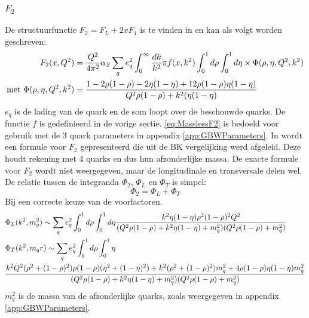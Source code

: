 \documentclass[a4paper,11pt]{article}
\numberwithin{equation}{section} %
\begin{document}
    \subsubsection{$F_2$} \label{sec:SF}
De structuurfunctie $F_2 = F_L + 2x F_1$ is te vinden in \cite[vgl. 9.200]{Barone} en kan als volgt worden geschreven:
\begin{align} \label{eq:MasslessF2}
F_2(x,Q^2) &= \frac{Q^2}{4\pi^2} \alpha_S \sum_q e_q^2 \int_0^\infty \frac{dk}{k^2}\pi f(x,k^2) \int_0^1 d\rho \int_0^1 d\eta \times \Phi(\rho, \eta, Q^2, k^2) \\
\text{met } \Phi(\rho, \eta, Q^2, k^2) &= \frac{1-2\rho(1-\rho)-2\eta(1-\eta)+12\rho(1-\rho)\eta(1-\eta)}{Q^2 \rho(1-\rho) + k^2 (\eta(1-\eta)}\notag
\end{align}
$e_q$ is de lading van de quark en de som loopt over de beschouwde quarks.
De functie $f$ is gedefinieerd in de vorige sectie.
\eqref{eq:MasslessF2} is bedoeld voor gebruik met de 3 quark parameters in appendix \ref{app:GBWParameters}.
In \cite{Bondarenko} wordt een formule voor $F_2$ gepresenteerd die uit de BK vergelijking werd afgeleid.
Deze houdt rekening met 4 quarks en dus hun afzonderlijke massa.
De exacte formule voor $F_2$ wordt niet weergegeven, maar de longitudinale en transversale delen wel.
De relatie tussen de integranda $\Phi_2$, $\Phi_L$ en $\Phi_T$ is simpel:
\begin{equation}
\Phi_2 = \Phi_L + \Phi_T
\end{equation}
Bij een correcte keuze van de voorfactoren.
\begin{align} \label{eq:MassiveSF}
&\Phi_L(k^2, m_q^2) \sim \sum_q e_q^2 \int_0^1 d\rho \int_0^1 d\eta \frac{k^2 \eta(1-\eta)\rho^2(1-\rho)^2 Q^2}{(Q^2\rho(1-\rho)+k^2\eta(1-\eta)+m_q^2)(Q^2\rho(1-\rho)+m_q^2)} \\
&\Phi_T(k^2, m_q^^2) \sim \sum_q e_q^2 \int_0^1 d\rho \int_0^1 \eta \notag \\
&\frac{k^2 Q^2 (\rho^2+(1-\rho)^2)\rho(1-\rho)(\eta^2+(1-\eta)^2)+k^2(\rho^2+(1-\rho)^2)m_q^2 + 4\rho(1-\rho)\eta(1-\eta)m_q^2}{(Q^2\rho(1-\rho)+k^2\eta(1-\eta)+m_q^2)(Q^2\rho(1-\rho)+m_q^2)}
\end{align}
$m_q^2$ is de massa van de afzonderlijke quarks, zoals weergegeven in appendix \ref{app:GBWParameters}.
\end{document}
